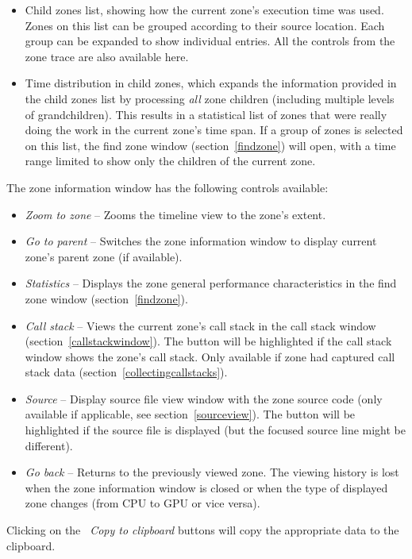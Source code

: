 \documentclass[hidelinks,titlepage,a4paper]{article}
\begin{document}
\begin{itemize}
\item Child zones list, showing how the current zone's execution time was used. Zones on this list can be grouped according to their source location. Each group can be expanded to show individual entries. All the controls from the zone trace are also available here.
\item Time distribution in child zones, which expands the information provided in the child zones list by processing \emph{all} zone children (including multiple levels of grandchildren). This results in a statistical list of zones that were really doing the work in the current zone's time span. If a group of zones is selected on this list, the find zone window (section~\ref{findzone}) will open, with a time range limited to show only the children of the current zone.
\end{itemize}

The zone information window has the following controls available:

\begin{itemize}
\item \emph{\faMicroscope{} Zoom to zone} -- Zooms the timeline view to the zone's extent.
\item \emph{\faArrowUp{} Go to parent} -- Switches the zone information window to display current zone's parent zone (if available).
\item \emph{\faChartBar{} Statistics} -- Displays the zone general performance characteristics in the find zone window (section~\ref{findzone}).
\item \emph{\faAlignJustify{} Call stack} -- Views the current zone's call stack in the call stack window (section~\ref{callstackwindow}). The button will be highlighted if the call stack window shows the zone's call stack. Only available if zone had captured call stack data (section~\ref{collectingcallstacks}).
\item \emph{\faFile*{} Source} -- Display source file view window with the zone source code (only available if applicable, see section~\ref{sourceview}). The button will be highlighted if the source file is displayed (but the focused source line might be different).
\item \emph{\faArrowLeft{} Go back} -- Returns to the previously viewed zone. The viewing history is lost when the zone information window is closed or when the type of displayed zone changes (from CPU to GPU or vice versa).
\end{itemize}

Clicking on the \emph{\faClipboard{}~Copy to clipboard} buttons will copy the appropriate data to the clipboard.
\end{document}
